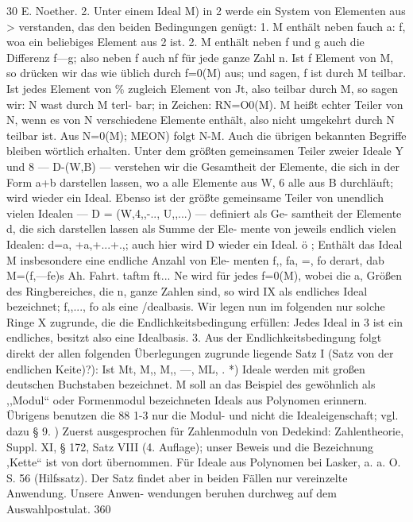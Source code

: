 \documentclass[11pt,a4paper]{article}
\theoremstyle{plain}
\theoremstyle{definition}
\begin{document}
30 
E. Noether. 
2. Unter einem Ideal M\textdegree{}) in 2 werde ein System von Elementen 
aus > verstanden, das den beiden Bedingungen genügt: 
1. M enthält neben fauch a: f, woa ein beliebiges Element aus 2 ist. 
2. M enthält neben f und g auch die Differenz f---g; 
also neben f 
auch nf 
für jede ganze Zahl n. 
Ist f Element von M, so drücken wir das wie üblich durch f=0(M) 
aus; und sagen, f ist durch M teilbar. 
Ist jedes Element von \% zugleich 
Element von Jt, also teilbar durch M, so sagen wir: N wast durch M terl- 
bar; in Zeichen: RN=O0(M). M heißt echter Teiler von N, wenn es von 
N verschiedene Elemente enthält, 
also nicht umgekehrt durch N teilbar 
ist. 
Aus N=0(M); MEON) folgt N-M. 
Auch die übrigen bekannten Begriffe bleiben wörtlich erhalten. 
Unter 
dem größten gemeinsamen Teiler zweier Ideale Y und 8 --- D-(W,B) --- 
verstehen wir die Gesamtheit der Elemente, 
die sich in der Form a+b 
darstellen 
lassen, wo a 
alle Elemente 
aus W, 6 alle aus B durchläuft; 
 wird wieder ein Ideal. 
Ebenso ist der größte gemeinsame Teiler von 
unendlich vielen Idealen --- D = (W,4,,-.., U,,...) --- definiert als Ge- 
samtheit der Elemente d, die sich darstellen lassen als Summe der Ele- 
mente von jeweils endlich vielen Idealen: 
d=a, 
+a,+...+.,; auch 
hier wird D wieder ein Ideal. 
ö 
; 
Enthält 
das Ideal M insbesondere 
eine endliche Anzahl 
von Ele- 
menten f,, fa, =, fo derart, dab 
M=(f,---fe)s 
Ah. Fahrt. 
taftm ft... Ne 
wird für jedes f=0(M), wobei die a, Größen des Ringbereiches, die n, 
ganze Zahlen sind, 
so wird IX als endliches Ideal bezeichnet; 
f,,..., fo 
als eine /dealbasis. 
Wir legen nun im folgenden nur solche Ringe X zugrunde, 
die die 
Endlichkeitsbedingung erfüllen: Jedes Ideal in 3 ist ein endliches, 
besitzt also eine Idealbasis. 
3. Aus der Endlichkeitsbedingung 
folgt direkt der allen folgenden 
Überlegungen zugrunde liegende 
Satz I (Satz von der endlichen Keite)?): Ist Mt, M,, M,, ---, ML, . 
*) Ideale werden mit großen deutschen Buchstaben bezeichnet. 
M soll an das 
Beispiel 
des gewöhnlich 
als ,,Modul`` 
oder Formenmodul 
bezeichneten Ideals 
aus 
Polynomen erinnern. 
Übrigens benutzen die 88 1-3 nur die Modul- und nicht die 
Idealeigenschaft; 
vgl. dazu \S{} 9. 
\textdegree{}) Zuerst ausgesprochen für Zahlenmoduln von Dedekind: Zahlentheorie, Suppl. XI, 
\S{} 172, Satz VIII (4. Auflage); 
unser Beweis und die Bezeichnung ,Kette`` ist von 
dort übernommen. 
Für Ideale aus Polynomen bei Lasker, 
a. a. O. S. 56 (Hilfssatz). 
Der Satz findet aber in beiden Fällen nur vereinzelte Anwendung. 
Unsere Anwen- 
wendungen beruhen durchweg auf dem Auswahlpostulat. 
360
\end{document}
